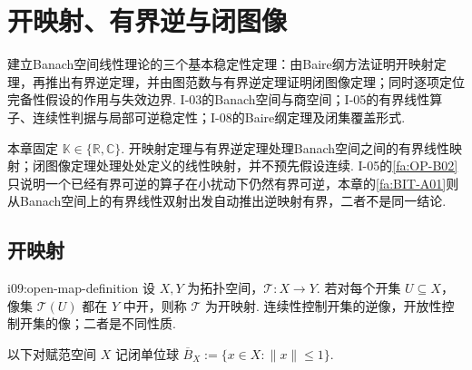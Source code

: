\chapter{开映射、有界逆与闭图像}\label{chap:I-09}
\FAChapterOpening
{建立Banach空间线性理论的三个基本稳定性定理：由Baire纲方法证明开映射定理，再推出有界逆定理，并由图范数与有界逆定理证明闭图像定理；同时逐项定位完备性假设的作用与失效边界.}
{I-03的Banach空间与商空间；I-05的有界线性算子、连续性判据与局部可逆稳定性；I-08的Baire纲定理及闭集覆盖形式.}
{\begin{center}
\end{center}}

本章固定 \(\displaystyle \mathbb K\in\{\mathbb R,\mathbb C\}\). 开映射定理与有界逆定理处理Banach空间之间的有界线性映射；闭图像定理处理处处定义的线性映射，并不预先假设连续. I-05的\autoref{fa:OP-B02}只说明一个已经有界可逆的算子在小扰动下仍然有界可逆，本章的\autoref{fa:BIT-A01}则从Banach空间上的有界线性双射出发自动推出逆映射有界，二者不是同一结论.

\section{开映射}\label{sec:i09-open-mapping}

\begin{FADefinition}[A][开映射]{i09:open-map-definition}
设 \(\displaystyle X,Y\) 为拓扑空间，\(\displaystyle \mathcal T:X\to Y\). 若对每个开集 \(\displaystyle U\subseteq X\)，像集 \(\displaystyle \mathcal T(U)\) 都在 \(\displaystyle Y\) 中开，则称 \(\displaystyle \mathcal T\) 为开映射. 连续性控制开集的逆像，开放性控制开集的像；二者是不同性质.
\end{FADefinition}

以下对赋范空间 \(\displaystyle X\) 记闭单位球
\(\displaystyle \overline B_X:=\{x\in X:\|x\|\leqslant1\}\).

